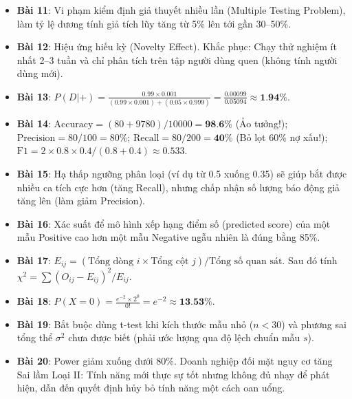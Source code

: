 \begin{dapanbox}
\begin{itemize}
    \item \textbf{Bài 11}: Vi phạm kiểm định giả thuyết nhiều lần (Multiple Testing Problem), làm tỷ lệ dương tính giả tích lũy tăng từ 5\% lên tới gần 30--50\%.
    \item \textbf{Bài 12}: Hiệu ứng hiếu kỳ (Novelty Effect). Khắc phục: Chạy thử nghiệm ít nhất 2--3 tuần và chỉ phân tích trên tập người dùng quen (không tính người dùng mới).
    \item \textbf{Bài 13}: $P(D|+) = \frac{0.99 \times 0.001}{(0.99 \times 0.001) + (0.05 \times 0.999)} = \frac{0.00099}{0.05094} \approx \textbf{1.94\%}$.
    \item \textbf{Bài 14}: $\text{Accuracy} = (80 + 9780)/10000 = \textbf{98.6\%}$ (Ảo tưởng!); $\text{Precision} = 80/100 = 80\%$; $\text{Recall} = 80/200 = \textbf{40\%}$ (Bỏ lọt 60\% nợ xấu!); $\text{F1} = 2 \times 0.8 \times 0.4 / (0.8 + 0.4) \approx 0.533$.
    \item \textbf{Bài 15}: Hạ thấp ngưỡng phân loại (ví dụ từ 0.5 xuống 0.35) sẽ giúp bắt được nhiều ca tích cực hơn (tăng Recall), nhưng chấp nhận số lượng báo động giả tăng lên (làm giảm Precision).
    \item \textbf{Bài 16}: Xác suất để mô hình xếp hạng điểm số (predicted score) của một mẫu Positive cao hơn một mẫu Negative ngẫu nhiên là đúng bằng 85\%.
    \item \textbf{Bài 17}: $E_{ij} = (\text{Tổng dòng } i \times \text{Tổng cột } j) / \text{Tổng số quan sát}$. Sau đó tính $\chi^2 = \sum (O_{ij} - E_{ij})^2 / E_{ij}$.
    \item \textbf{Bài 18}: $P(X = 0) = \frac{e^{-2} \times 2^0}{0!} = e^{-2} \approx \textbf{13.53\%}$.
    \item \textbf{Bài 19}: Bắt buộc dùng t-test khi kích thước mẫu nhỏ ($n < 30$) và phương sai tổng thể $\sigma^2$ chưa được biết (phải ước lượng qua độ lệch chuẩn mẫu $s$).
    \item \textbf{Bài 20}: Power giảm xuống dưới 80\%. Doanh nghiệp đối mặt nguy cơ tăng Sai lầm Loại II: Tính năng mới thực sự tốt nhưng không đủ nhạy để phát hiện, dẫn đến quyết định hủy bỏ tính năng một cách oan uổng.
\end{itemize}
\end{dapanbox}
